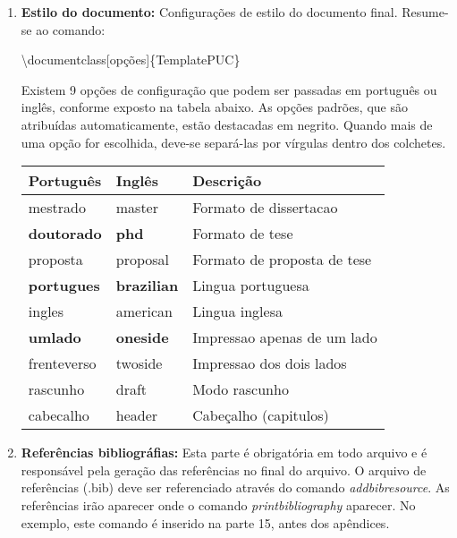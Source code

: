 \documentclass{book}
\newcommand{\bs}{\textbackslash}
\begin{document}
  \begin{enumerate}
      \item \textbf{Estilo do documento:} Configurações de estilo do documento final. Resume-se ao comando:
      
      \hspace{0.5cm} \bs documentclass[opções]\{TemplatePUC\}
      
      Existem 9 opções de configuração que podem ser passadas em português ou inglês, conforme exposto na tabela abaixo. As opções padrões, que são atribuídas automaticamente, estão destacadas em negrito. Quando mais de uma opção for escolhida, deve-se separá-las por vírgulas dentro dos colchetes.
      
      \begin{center}
      \begin{tabular}{ l l l }
       \hline
       Português          & Inglês   & Descrição \\
       \hline
       mestrado           & master    & Formato de dissertacao        \\
       \bf doutorado      & \bf phd       & Formato de tese               \\
       proposta           & proposal  & Formato de proposta de tese   \\
       \bf portugues      & \bf brazilian & Lingua portuguesa             \\
       ingles             & american  & Lingua inglesa                \\
       \bf umlado         & \bf oneside   & Impressao apenas de um lado   \\
       frenteverso        & twoside   & Impressao dos dois lados      \\
       rascunho           & draft     & Modo rascunho                 \\
       cabecalho          & header    & Cabeçalho (capitulos)         \\
       \hline
       
      \end{tabular}
      \end{center}

      \item \textbf{Referências bibliográfias:} Esta parte é obrigatória em todo arquivo e é responsável pela geração das referências no final do arquivo. O arquivo de referências (.bib) deve ser referenciado através do comando \textit{addbibresource}. As referências irão aparecer onde o comando \textit{printbibliography} aparecer. No exemplo, este comando é inserido na parte 15, antes dos apêndices.
      

\end{enumerate}
\end{document}
